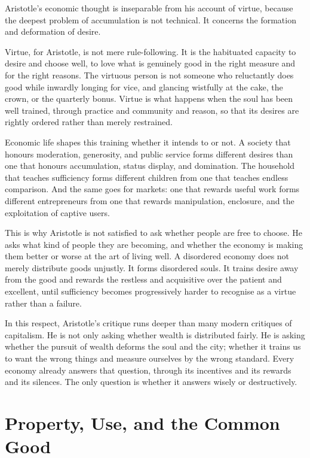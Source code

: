 \documentclass[11pt,a4paper,oneside]{book}
\begin{document}
Aristotle's economic thought is inseparable from his account of virtue, because the deepest problem of accumulation is not technical. It concerns the formation and deformation of desire.

Virtue, for Aristotle, is not mere rule-following. It is the habituated capacity to desire and choose well, to love what is genuinely good in the right measure and for the right reasons. The virtuous person is not someone who reluctantly does good while inwardly longing for vice, and glancing wistfully at the cake, the crown, or the quarterly bonus. Virtue is what happens when the soul has been well trained, through practice and community and reason, so that its desires are rightly ordered rather than merely restrained.

Economic life shapes this training whether it intends to or not. A society that honours moderation, generosity, and public service forms different desires than one that honours accumulation, status display, and domination. The household that teaches sufficiency forms different children from one that teaches endless comparison. And the same goes for markets: one that rewards useful work forms different entrepreneurs from one that rewards manipulation, enclosure, and the exploitation of captive users.

This is why Aristotle is not satisfied to ask whether people are free to choose. He asks what kind of people they are becoming, and whether the economy is making them better or worse at the art of living well. A disordered economy does not merely distribute goods unjustly. It forms disordered souls. It trains desire away from the good and rewards the restless and acquisitive over the patient and excellent, until sufficiency becomes progressively harder to recognise as a virtue rather than a failure.

In this respect, Aristotle's critique runs deeper than many modern critiques of capitalism. He is not only asking whether wealth is distributed fairly. He is asking whether the pursuit of wealth deforms the soul and the city; whether it trains us to want the wrong things and measure ourselves by the wrong standard. Every economy already answers that question, through its incentives and its rewards and its silences. The only question is whether it answers wisely or destructively.

\section*{Property, Use, and the Common Good}
\end{document}
